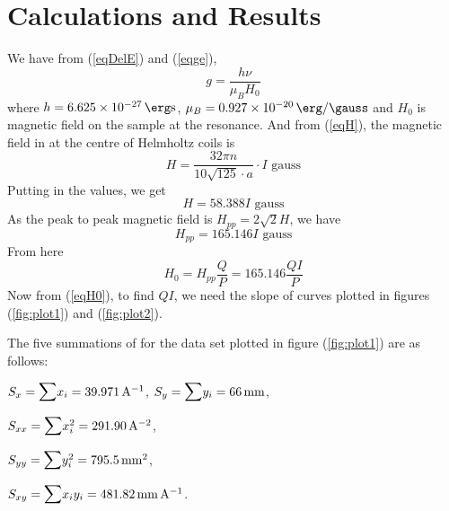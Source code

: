 \documentclass[%
 reprint,
nofootinbib,
 amsmath,amssymb,
 aps,
floatfix,
]{revtex4-2}
\begin{document}
\section{Calculations and Results}
    We have from (\ref{eqDelE}) and (\ref{eqge}),
    \begin{equation}
    \label{eq26}
        g = \dfrac{h \nu}{\mu_B H_0}
    \end{equation}
    where $h = \SI{6.625e-27}{\erg \second}$, $\mu_B = \SI{0.927e-20}{\erg \per \gauss}$ and $H_0$ is magnetic field on the sample at the resonance. And from (\ref{eqH}), the magnetic field in at the centre of Helmholtz coils is
    \begin{equation}
        H = \dfrac{32 \pi n}{10 \sqrt{125} \cdot a} \cdot I \text{ gauss}
    \end{equation}
    Putting in the values, we get
    \begin{equation}
        H = 58.388 I \text{ gauss}
    \end{equation}
    As the peak to peak magnetic field is $H_{pp} = 2 \sqrt{2} H$, we have
    \begin{equation}
        H_{pp} = 165.146 I \text{ gauss}
    \end{equation}
    From here
    \begin{equation}
        H_0 = H_{pp} \dfrac{Q}{P} = 165.146 \dfrac{QI}{P}
    \end{equation}
    Now from (\ref{eqH0}), to find $QI$, we need the slope of curves plotted in figures (\ref{fig:plot1}) and (\ref{fig:plot2}).
    \par
    The five summations of for the data set plotted in figure (\ref{fig:plot1}) are as follows:
    \par
    \vspace{0.5cm}
    $S_{x} = \mathlarger{\mathlarger{\sum}} x_{i} = \SI{39.971}{\per \ampere}$, \hspace{0.5cm} $S_{y} = \mathlarger{\mathlarger{\sum}} y_{i} = \SI{66}{\milli \metre}$,
    \par
    \vspace{0.5cm}
    $S_{xx} = \mathlarger{\mathlarger{\sum}} x_{i}^2 = \SI{291.90}{\per \ampere \squared}$,
    \par
    \vspace{0.5cm}
    $S_{yy} = \mathlarger{\mathlarger{\sum}} y_{i}^2 = \SI{795.5}{\milli \metre \squared}$,
    \par
    \vspace{0.5cm}
    $S_{xy} = \mathlarger{\mathlarger{\sum}} x_{i}y_{i} = \SI{481.82}{\milli \metre \per \ampere}$.
\end{document}
